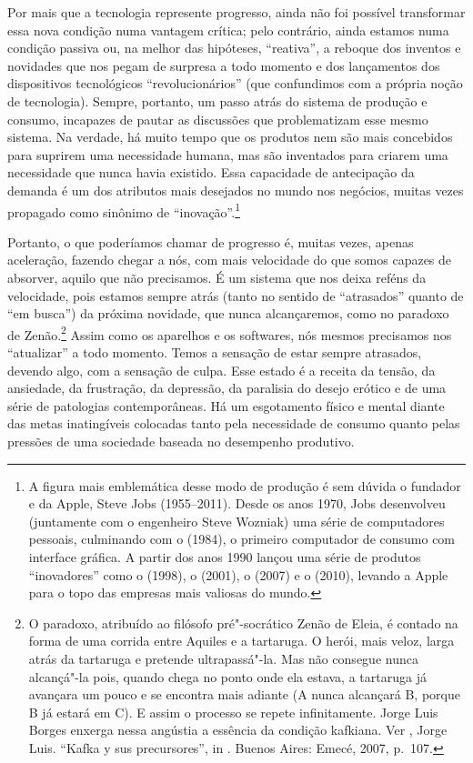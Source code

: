Por mais que a tecnologia represente progresso, ainda não foi possível
transformar essa nova condição numa vantagem crítica; pelo contrário,
ainda estamos numa condição passiva ou, na melhor das hipóteses,
``reativa'', a reboque dos inventos e novidades que nos pegam de
surpresa a todo momento e dos lançamentos dos dispositivos tecnológicos
``revolucionários'' (que confundimos com a própria noção de tecnologia).
Sempre, portanto, um passo atrás do sistema de produção e consumo,
incapazes de pautar as discussões que problematizam esse mesmo sistema.
Na verdade, há muito tempo que os produtos nem são mais concebidos para
suprirem uma necessidade humana, mas são inventados para criarem uma
necessidade que nunca havia existido. Essa capacidade de antecipação da
demanda é um dos atributos mais desejados no mundo nos negócios, muitas
vezes propagado como sinônimo de ``inovação''.\footnote{A figura mais
  emblemática desse modo de produção é sem dúvida o fundador e  da
  Apple, Steve Jobs (1955--2011). Desde os anos 1970, Jobs desenvolveu
  (juntamente com o engenheiro Steve Wozniak) uma série de computadores
  pessoais, culminando com o {} (1984), o primeiro
  computador de consumo com interface gráfica. A partir dos anos 1990
  lançou uma série de produtos ``inovadores'' como o {} (1998),
  o {} (2001), o {} (2007) e o {} (2010),
  levando a Apple para o topo das empresas mais valiosas do mundo.}

Portanto, o que poderíamos chamar de progresso é, muitas vezes, apenas
aceleração, fazendo chegar a nós, com mais velocidade do que somos
capazes de absorver, aquilo que não precisamos. É um sistema que nos
deixa reféns da velocidade, pois estamos sempre atrás (tanto no
sentido de ``atrasados'' quanto de ``em busca'') da próxima novidade,
que nunca alcançaremos, como no paradoxo de Zenão.\footnote{O paradoxo,
  atribuído ao filósofo pré"-socrático Zenão de Eleia, é contado na forma
  de uma corrida entre Aquiles e a tartaruga. O herói, mais veloz, larga
  atrás da tartaruga e pretende ultrapassá"-la. Mas não consegue nunca
  alcançá"-la pois, quando chega no ponto onde ela estava, a tartaruga já
  avançara um pouco e se encontra mais adiante (A nunca alcançará B,
  porque B já estará em C). E assim o processo se repete infinitamente.
  Jorge Luis Borges enxerga nessa angústia a essência da condição
  kafkiana. Ver , Jorge Luis. ``Kafka y sus precursores'', in
  {}. Buenos Aires: Emecé, 2007, p.~107.} Assim como os aparelhos e os softwares, nós mesmos precisamos
nos ``atualizar'' a todo momento. Temos a sensação de estar
sempre atrasados, devendo algo, com a sensação de culpa. Esse estado é a
receita da tensão, da ansiedade, da frustração, da depressão, da
paralisia do desejo erótico e de uma série de patologias contemporâneas.
Há um esgotamento físico e mental diante das metas inatingíveis
colocadas tanto pela necessidade de consumo quanto pelas pressões de uma
sociedade baseada no desempenho produtivo.

